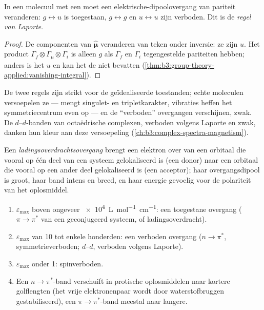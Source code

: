 \begin{theorem}\label{thm:b3:electronic-spectroscopy:laporte}
In een molecuul met een  moet een elektrische-dipoolovergang
van pariteit veranderen: $g \leftrightarrow u$ is toegestaan, $g \leftrightarrow g$ en $u
\leftrightarrow u$ zijn verboden. Dit is de
\emph{regel van Laporte}.
\end{theorem}

\begin{proof}
De componenten van $\hat{\boldsymbol\mu}$ veranderen van teken onder
inversie: ze zijn $u$.
Het product $\Gamma_f\otimes\Gamma_\mu\otimes\Gamma_i$ is alleen $g$ als $\Gamma_f$ en $\Gamma_i$
tegengestelde pariteiten hebben; anders is het $u$ en kan het de
 niet bevatten
(\cref{thm:b3:group-theory-applied:vanishing-integral}).
\end{proof}

De twee regels zijn strikt voor de geïdealiseerde toestanden; echte
moleculen versoepelen ze ---  mengt singulet- en
tripletkarakter, vibraties heffen het symmetriecentrum even op --- en de
``verboden'' overgangen verschijnen, zwak. De $d$--$d$-banden van
octaëdrische complexen, verboden volgens Laporte en zwak, danken hun
kleur aan deze versoepeling
(\cref{ch:b3:complex-spectra-magnetism}).

\begin{definition}[Ladingsoverdrachtsovergang]\label{def:b3:electronic-spectroscopy:charge-transfer}
Een \emph{ladingsoverdrachtsovergang}
brengt een elektron over van een orbitaal die vooral op één deel van een
systeem gelokaliseerd is (een donor) naar een orbitaal die vooral op een
ander deel gelokaliseerd is (een acceptor); haar overgangsdipool is groot,
haar band intens en breed, en haar energie gevoelig voor de polariteit
van het oplosmiddel.
\end{definition}

\begin{method}\label{met:b3:electronic-spectroscopy:assign-band}
\begin{enumerate}
  \item $\varepsilon_{\max}$ boven ongeveer \qty{e4}{L.mol^{-1}.cm^{-1}}: een toegestane
        overgang ($\pi\to\pi^*$ van een geconjugeerd systeem, of
        ladingsoverdracht).
  \item $\varepsilon_{\max}$ van 10 tot enkele honderden: een verboden overgang ($n\to\pi^*$,
        symmetrieverboden; $d$--$d$, verboden volgens Laporte).
  \item $\varepsilon_{\max}$ onder 1: spinverboden.
  \item Een $n\to\pi^*$-band verschuift in protische oplosmiddelen naar
        kortere golflengten (het vrije elektronenpaar wordt door
        waterstofbruggen gestabiliseerd), een $\pi\to\pi^*$-band meestal
        naar langere.
\end{enumerate}
\end{method}

